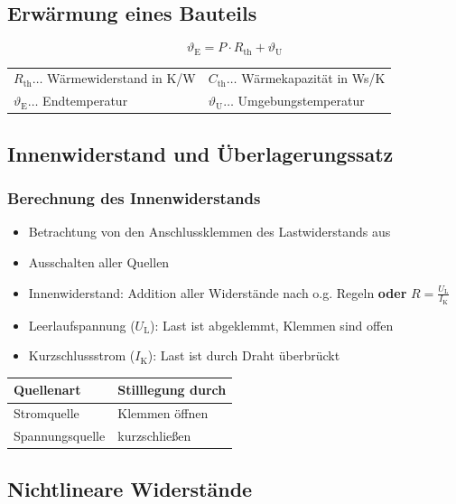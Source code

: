 	\subsection{Erwärmung eines Bauteils}
		\[
			\vartheta_{\mathrm{E}}=P\cdot R_{\mathrm{th}}+\vartheta_{\mathrm{U}}
		\]

		\begin{table}[h]
		\begin{tabular}{ll}
		$R_{\mathrm{th}}\dots$ Wärmewiderstand in K/W & $C_{\mathrm{th}}\dots$ Wärmekapazität in Ws/K\\
		$\vartheta_{\mathrm{E}}\dots$ Endtemperatur & $\vartheta_{\mathrm{U}}\dots$ Umgebungstemperatur\\
		\end{tabular}
		\end{table}

	\subsection{Innenwiderstand und Überlagerungssatz}
		\subsubsection{Berechnung des Innenwiderstands}
			\begin{itemize}
				\item Betrachtung von den Anschlussklemmen des Lastwiderstands aus
				\item Ausschalten aller Quellen
				\item Innenwiderstand: Addition aller Widerstände nach o.g. Regeln \textbf{oder} $R=\frac{U_{\mathrm{L}}}{I_{\mathrm{K}}}$
				\item Leerlaufspannung ($U_{\mathrm{L}}$): Last ist abgeklemmt, Klemmen sind offen
				\item Kurzschlussstrom ($I_{\mathrm{K}}$): Last ist durch Draht überbrückt
			\end{itemize}
			\begin{table}[here]
			\begin{tabular}{ll}
			Quellenart & Stilllegung durch\\
			\toprule
			Stromquelle & Klemmen öffnen\\
			\midrule
			Spannungsquelle & kurzschließen\\
			\end{tabular}
			\end{table}

	\subsection{Nichtlineare Widerstände}
